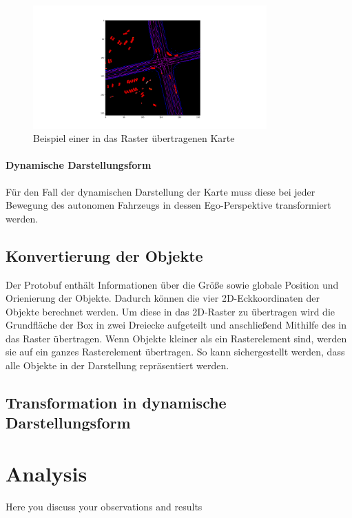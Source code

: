 \documentclass[12pt]{article}
\begin{document}
        \begin{figure}[h]
            \centering
            \includegraphics[width=0.8\textwidth]{visu_past_uncompressed_tf_example_training_training_tfexample_tfrecord-00000-of-01000.png}
            \caption{Beispiel einer in das Raster übertragenen Karte}
        \end{figure}

        \paragraph{Dynamische Darstellungsform}
            Für den Fall der dynamischen Darstellung der Karte muss diese bei jeder Bewegung des autonomen Fahrzeugs 
            in dessen Ego-Perspektive transformiert werden. 

        

    \subsection{Konvertierung der Objekte}
        Der Protobuf enthält Informationen über die Größe sowie globale Position und Orienierung der Objekte. 
        Dadurch können die vier 2D-Eckkoordinaten der Objekte berechnet werden. Um diese in das 2D-Raster zu übertragen wird die Grundfläche der Box in 
        zwei Dreiecke aufgeteilt und anschließend Mithilfe des %
        in das Raster übertragen. Wenn Objekte kleiner als ein Rasterelement sind, werden sie auf ein ganzes Rasterelement übertragen. 
        So kann sichergestellt werden, dass alle Objekte in der Darstellung repräsentiert werden.

    \subsection{Transformation in dynamische Darstellungsform}


\section{Analysis}
	Here you discuss your observations and results
	
\end{document}
